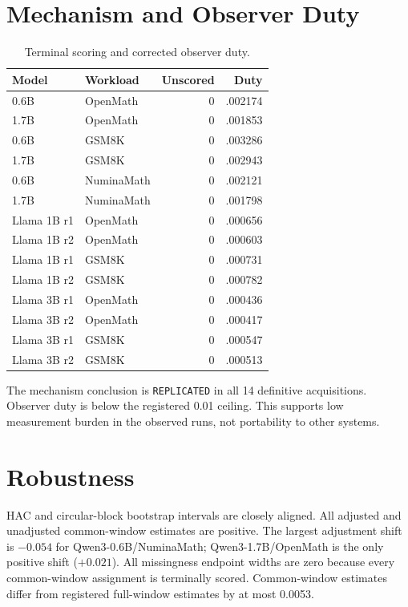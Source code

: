 \documentclass{article}
\begin{document}
\section{Mechanism and Observer Duty}
\begin{table}[h]
\caption{Terminal scoring and corrected observer duty.}
\centering\small
\begin{tabular}{llrr}
\toprule
Model & Workload & Unscored & Duty \\
\midrule
0.6B & OpenMath & 0 & .002174 \\
1.7B & OpenMath & 0 & .001853 \\
0.6B & GSM8K & 0 & .003286 \\
1.7B & GSM8K & 0 & .002943 \\
0.6B & NuminaMath & 0 & .002121 \\
1.7B & NuminaMath & 0 & .001798 \\
Llama 1B r1 & OpenMath & 0 & .000656 \\
Llama 1B r2 & OpenMath & 0 & .000603 \\
Llama 1B r1 & GSM8K & 0 & .000731 \\
Llama 1B r2 & GSM8K & 0 & .000782 \\
Llama 3B r1 & OpenMath & 0 & .000436 \\
Llama 3B r2 & OpenMath & 0 & .000417 \\
Llama 3B r1 & GSM8K & 0 & .000547 \\
Llama 3B r2 & GSM8K & 0 & .000513 \\
\bottomrule
\end{tabular}
\end{table}
The mechanism conclusion is \texttt{REPLICATED} in all 14 definitive acquisitions. Observer duty is below the registered 0.01 ceiling. This supports low measurement burden in the observed runs, not portability to other systems.

\section{Robustness}
HAC and circular-block bootstrap intervals are closely aligned. All adjusted and unadjusted common-window estimates are positive. The largest adjustment shift is $-0.054$ for Qwen3-0.6B/NuminaMath; Qwen3-1.7B/OpenMath is the only positive shift ($+0.021$). All missingness endpoint widths are zero because every common-window assignment is terminally scored. Common-window estimates differ from registered full-window estimates by at most 0.0053.
\end{document}
